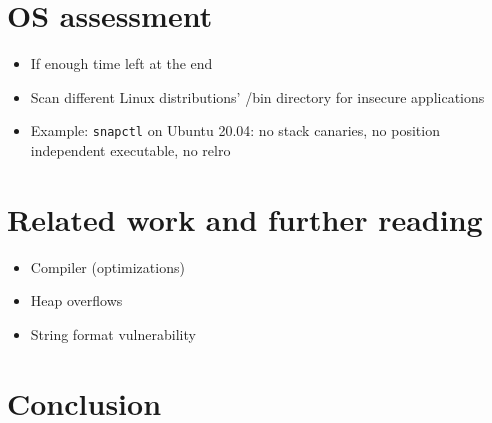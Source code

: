 \chapter{OS assessment}
\label{chp:os-assessment}

\begin{itemize}
	\item{If enough time left at the end}
	\item{Scan different Linux distributions' /bin directory for insecure applications}
	\item{Example: \texttt{snapctl} on Ubuntu 20.04: no stack canaries, no position independent executable, no \gls{relro}}
\end{itemize}
%

\chapter{Related work and further reading}
\label{chp:related-work}

\begin{itemize}
	\item{Compiler (optimizations)}
	\item{Heap overflows}
	\item{String format vulnerability}
\end{itemize}

\chapter{Conclusion}
\label{chp:conclusion}